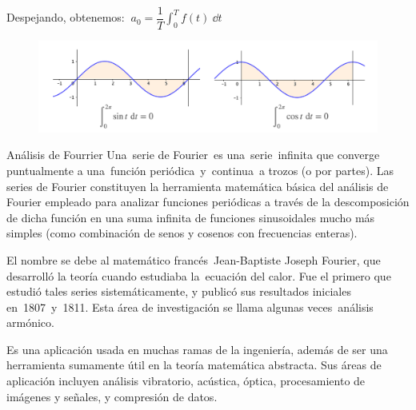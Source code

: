 \normalsize{Despejando, obtenemos:} $\ a_0=\displaystyle \dfrac 1 T \int_0^T f(t)\ \dd t$

\begin{figure}[H]
		\centering
		\includegraphics[width=1\textwidth]{imagenes/imagenes20/T20IM11.png}
	\end{figure}

\newpage
\begin{myblock}{Análisis de Fourrier}
Una serie de Fourier es una serie infinita que converge puntualmente a una función periódica y continua a trozos (o por partes). Las series de Fourier constituyen la herramienta matemática básica del análisis de Fourier empleado para analizar funciones periódicas a través de la descomposición de dicha función en una suma infinita de funciones sinusoidales mucho más simples (como combinación de senos y cosenos con frecuencias enteras). 
\begin{multicols}{2}
El nombre se debe al matemático francés Jean-Baptiste Joseph Fourier, que desarrolló la teoría cuando estudiaba la ecuación del calor. Fue el primero que estudió tales series sistemáticamente, y publicó sus resultados iniciales en 1807 y 1811. Esta área de investigación se llama algunas veces análisis armónico.

Es una aplicación usada en muchas ramas de la ingeniería, además de ser una herramienta sumamente útil en la teoría matemática abstracta. Sus áreas de aplicación incluyen análisis vibratorio, acústica, óptica, procesamiento de imágenes y señales, y compresión de datos.



\end{multicols}
\end{myblock}
